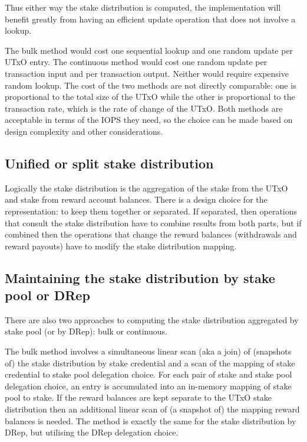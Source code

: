 \documentclass[11pt,a4paper]{article}
\begin{document}
Thus either way the stake distribution is computed, the implementation will
benefit greatly from having an efficient update operation that does not involve
a lookup.

The bulk method would cost one sequential lookup and one random update per UTxO
entry. The continuous method would cost one random update per transaction input
and per transaction output. Neither would require expensive random lookup.
The cost of the two methods are not directly comparable: one is proportional to
the total size of the UTxO while the other is proportional to the transaction
rate, which is the rate of change of the UTxO. Both methods are acceptable in
terms of the IOPS they need, so the choice can be made based on design
complexity and other considerations.

\subsection{Unified or split stake distribution}
\label{sec:unified-or-split-stake-distribution}

Logically the stake distribution is the aggregation of the stake from the UTxO
and stake from reward account balances. There is a design choice for the
representation: to keep them together or separated. If separated, then
operations that consult the stake distribution have to combine results from
both parts, but if combined then the operations that change the reward balances
(withdrawals and reward payouts) have to modify the stake distribution mapping.

\subsection{Maintaining the stake distribution by stake pool or DRep}
\label{sec:maintaining-the-stake-distribution-by-stake-pool-or-DRep}

There are also two approaches to computing the stake distribution aggregated by
stake pool (or by DRep): bulk or continuous.

The bulk method involves a simultaneous linear scan (aka a join) of (snapshots
of) the stake distribution by stake credential and a scan of the mapping of
stake credential to stake pool delegation choice. For each pair of stake and
stake pool delegation choice, an entry is accumulated into an in-memory mapping
of stake pool to stake. If the reward balances are kept separate to the UTxO
stake distribution then an additional linear scan of (a snapshot of) the
mapping reward balances is needed. The method is exactly the same for the stake
distribution by DRep, but utilising the DRep delegation choice.
\end{document}
